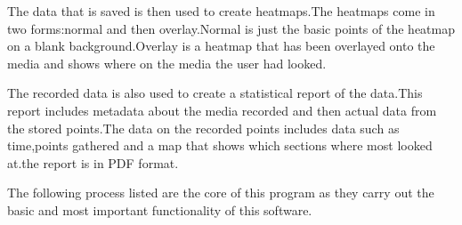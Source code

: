 The data that is saved is then used to create heatmaps.The heatmaps come in two forms:normal and then overlay.Normal is just the basic points of the heatmap on a blank background.Overlay is a heatmap that has been overlayed onto the media and shows where on the media the user had looked.

The recorded data is also used to create a statistical report of the data.This report includes metadata about the media recorded and then actual data from the stored points.The data on the recorded points includes  data such as time,points gathered and a map that shows which sections where most looked at.the report is in PDF format.

The following process listed are the core of this program as they carry out the basic and most important functionality of this software.
